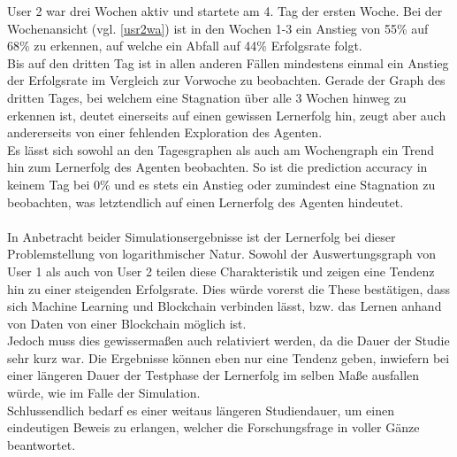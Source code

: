 User 2 war drei Wochen aktiv und startete am 4. Tag der ersten Woche.
Bei der Wochenansicht (vgl. \ref{usr2wa}) ist in den Wochen 1-3 ein Anstieg von 55\% auf 68\% zu erkennen, auf welche ein Abfall auf 44\% Erfolgsrate folgt. \\
Bis auf den dritten Tag ist in allen anderen Fällen mindestens einmal ein Anstieg der Erfolgsrate im Vergleich zur Vorwoche zu beobachten. Gerade der Graph des dritten Tages, bei welchem eine Stagnation über alle 3 Wochen hinweg zu erkennen ist, deutet einerseits auf einen gewissen Lernerfolg hin, zeugt aber auch andererseits von einer fehlenden Exploration des Agenten. \\
Es lässt sich sowohl an den Tagesgraphen als auch am Wochengraph ein Trend hin zum Lernerfolg des Agenten beobachten. So ist die prediction accuracy in keinem Tag bei 0\% und es stets ein Anstieg oder zumindest eine Stagnation zu beobachten, was letztendlich auf einen Lernerfolg des Agenten hindeutet.
\\\\
In Anbetracht beider Simulationsergebnisse ist der Lernerfolg bei dieser Problemstellung von logarithmischer Natur. Sowohl der Auswertungsgraph von User 1 als auch von User 2 teilen diese Charakteristik und zeigen eine Tendenz hin zu einer steigenden Erfolgsrate. Dies würde vorerst die These bestätigen, dass sich Machine Learning und Blockchain verbinden lässt, bzw. das Lernen anhand von Daten von einer Blockchain möglich ist. \\
Jedoch muss dies gewissermaßen auch relativiert werden, da die Dauer der Studie sehr kurz war. Die Ergebnisse können eben nur eine Tendenz geben, inwiefern bei einer längeren Dauer der Testphase der Lernerfolg im selben Maße ausfallen würde, wie im Falle der Simulation. \\
Schlussendlich bedarf es einer weitaus längeren Studiendauer, um einen eindeutigen Beweis zu erlangen, welcher die Forschungsfrage in voller Gänze beantwortet. 

